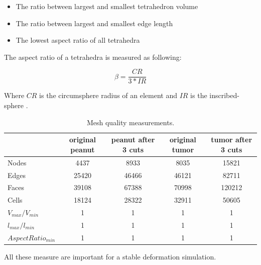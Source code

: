 \begin{itemize}
 \item The ratio between largest and smallest tetrahedron volume
 \item The ratio between largest and smallest edge length
 \item The lowest aspect ratio of all tetrahedra 
\end{itemize}

The aspect ratio of a tetrahedra is measured as following:

\begin{equation}
\beta = \frac{CR}{3*IR} 
\end{equation}

Where $CR$ is the circumsphere radius of an element and $IR$ is the inscribed-sphere \cite{parthasarathy1994comparison}. 

 
\begin{table}[H]
\begin{center}
\caption{\label{table:meshquality}{Mesh quality measurements.}}
  \begin{tabular}{ | l | c | c || c | c |}
    \hline    
     & original peanut & peanut after 3 cuts & original tumor & tumor after 3 cuts \\ \hline \hline    
    Nodes & 4437 & 8933 & 8035 & 15821  \\ \hline
    Edges & 25420 & 46466 & 46121 & 82711 \\ \hline
    Faces & 39108 & 67388 & 70998 & 120212 \\ \hline
    Cells & 18124 & 28322 & 32911 & 50605 \\ \hline
    $V_{max} / V_{min}$ & 1 & 1 & 1 & 1 \\ \hline
    $l_{max} / l_{min}$ & 1 & 1 & 1 & 1 \\ \hline
    $AspectRatio_{min}$ & 1 & 1 & 1 & 1 \\ \hline

    \hline
  \end{tabular}
\end{center}
\end{table}

All these measure are important for a stable deformation simulation. 